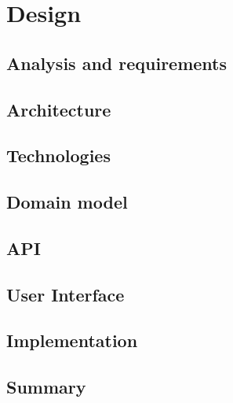 \section{Design}
\label{sec:design}


\subsection{Analysis and requirements}

\subsection{Architecture}

\subsection{Technologies}

\subsection{Domain model}

\subsection{API}

\subsection{User Interface}

\subsection{Implementation}

\subsection{Summary}
